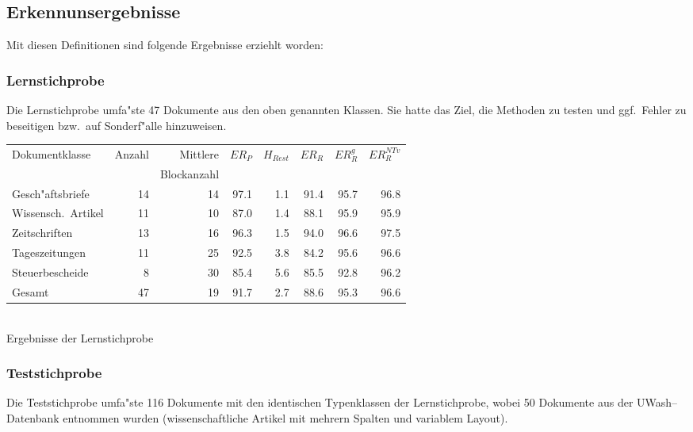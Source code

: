 \subsection{Erkennunsergebnisse}
Mit diesen Definitionen sind folgende Ergebnisse erziehlt worden:

\subsubsection{Lernstichprobe}
Die Lernstichprobe umfa"ste 47 Dokumente aus den oben genannten Klassen. Sie hatte das Ziel, 
die Methoden zu testen und ggf.\ Fehler zu beseitigen bzw.\ auf Sonderf"alle hinzuweisen.

\begin{center}\small
\begin{tabular}{|l|r|r|r|r|r|r|r|}
\hline
Dokumentklasse   &   Anzahl & Mittlere& $ER_{P}$& $H_{Rest}$ & $ER_{R}$ & $ER_{R}^{g}$ & $ER_{R}^{NTv}$\\
                 &          &Blockanzahl& &  & & & \\
\hline
Gesch"aftsbriefe           & 14 & 14 & 97.1 & 1.1 & 91.4 & 95.7 & 96.8\\
Wissensch.\ Artikel       & 11 & 10 & 87.0 & 1.4 & 88.1 & 95.9 & 95.9\\
Zeitschriften             & 13 & 16 & 96.3 & 1.5 & 94.0 & 96.6 & 97.5\\
Tageszeitungen            & 11 & 25 & 92.5 & 3.8 & 84.2 & 95.6 & 96.6\\
Steuerbescheide           &  8 & 30 & 85.4 & 5.6 & 85.5 & 92.8 & 96.2\\
\hline
Gesamt                    & 47 & 19 & 91.7 & 2.7 & 88.6 & 95.3 & 96.6\\
\hline
\end{tabular}\\[3mm]
Ergebnisse der Lernstichprobe
\end{center}

\subsubsection{Teststichprobe}
Die Teststichprobe umfa"ste 116 Dokumente mit den identischen Typenklassen der Lernstichprobe,
wobei 50 Dokumente aus der UWash--Datenbank entnommen wurden (wissenschaftliche Artikel mit
mehrern Spalten und variablem Layout).

